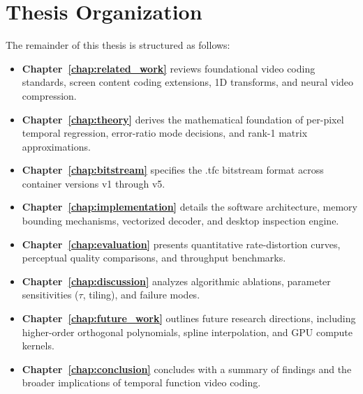 \section{Thesis Organization}
The remainder of this thesis is structured as follows:
\begin{itemize}
    \item \textbf{Chapter~\ref{chap:related_work}} reviews foundational video coding standards, screen content coding extensions, 1D transforms, and neural video compression.
    \item \textbf{Chapter~\ref{chap:theory}} derives the mathematical foundation of per-pixel temporal regression, error-ratio mode decisions, and rank-1 matrix approximations.
    \item \textbf{Chapter~\ref{chap:bitstream}} specifies the .tfc bitstream format across container versions v1 through v5.
    \item \textbf{Chapter~\ref{chap:implementation}} details the software architecture, memory bounding mechanisms, vectorized decoder, and desktop inspection engine.
    \item \textbf{Chapter~\ref{chap:evaluation}} presents quantitative rate-distortion curves, perceptual quality comparisons, and throughput benchmarks.
    \item \textbf{Chapter~\ref{chap:discussion}} analyzes algorithmic ablations, parameter sensitivities ($\tau$, tiling), and failure modes.
    \item \textbf{Chapter~\ref{chap:future_work}} outlines future research directions, including higher-order orthogonal polynomials, spline interpolation, and GPU compute kernels.
    \item \textbf{Chapter~\ref{chap:conclusion}} concludes with a summary of findings and the broader implications of temporal function video coding.
\end{itemize}
